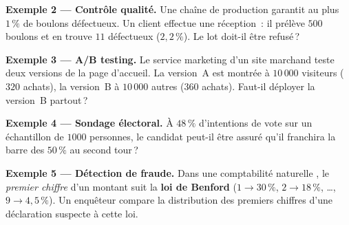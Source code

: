 
\textbf{Exemple 2 --- Contrôle qualité.} Une chaîne de production garantit au plus $1\,\%$ de boulons défectueux. Un client effectue une réception~: il prélève $500$ boulons et en trouve $11$ défectueux ($2{,}2\,\%$). Le lot doit-il être refusé\,?


\textbf{Exemple 3 --- A/B testing.} Le service marketing d'un site marchand teste deux versions de la page d'accueil. La version~A est montrée à $10\,000$ visiteurs ($320$ achats), la version~B à $10\,000$ autres ($360$ achats). Faut-il déployer la version~B partout\,?


\textbf{Exemple 4 --- Sondage électoral.} À $48\,\%$ d'intentions de vote sur un échantillon de $1000$ personnes, le candidat peut-il être assuré qu'il franchira la barre des $50\,\%$ au second tour\,?


\textbf{Exemple 5 --- Détection de fraude.} Dans une comptabilité \og naturelle \fg, le \emph{premier chiffre} d'un montant suit la \textbf{loi de Benford} ($1 \to 30\,\%$, $2 \to 18\,\%$, \ldots, $9 \to 4{,}5\,\%$). Un enquêteur compare la distribution des premiers chiffres d'une déclaration suspecte à cette loi.


\medskip

